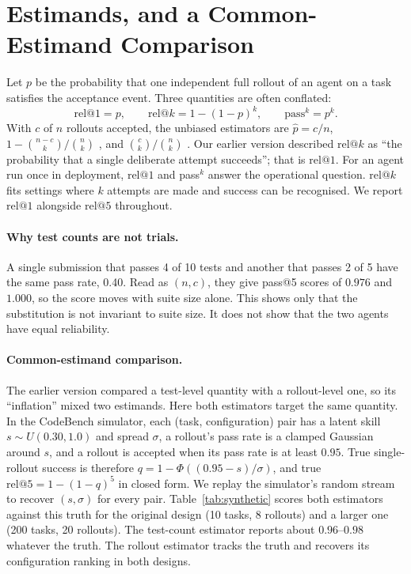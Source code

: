 \documentclass[11pt,a4paper]{article}
\makeatletter
\newcommand{\relk}[1]{\mathrm{rel}@#1}
\makeatother
\begin{document}
\section{Estimands, and a Common-Estimand Comparison}
\label{sec:estimand}

Let $p$ be the probability that one independent full rollout of an agent on a task satisfies the acceptance event. Three quantities are often conflated:
\begin{equation}
  \relk{1}=p,\qquad
  \relk{k}=1-(1-p)^k,\qquad
  \mathrm{pass}^k=p^k .
  \label{eq:estimands}
\end{equation}
With $c$ of $n$ rollouts accepted, the unbiased estimators are $\hat p=c/n$, $1-\binom{n-c}{k}/\binom{n}{k}$ \citep{chen2021codex}, and $\binom{c}{k}/\binom{n}{k}$ \citep{yao2025taubench}. Our earlier version described $\relk{k}$ as ``the probability that a single deliberate attempt succeeds''; that is $\relk{1}$. For an agent run once in deployment, $\relk{1}$ and pass$^k$ answer the operational question. $\relk{k}$ fits settings where $k$ attempts are made and success can be recognised. We report $\relk{1}$ alongside $\relk{5}$ throughout.

\paragraph{Why test counts are not trials.}
A single submission that passes 4 of 10 tests and another that passes 2 of 5 have the same pass rate, 0.40. Read as $(n,c)$, they give pass@5 scores of $0.976$ and $1.000$, so the score moves with suite size alone. This shows only that the substitution is not invariant to suite size. It does not show that the two agents have equal reliability.

\paragraph{Common-estimand comparison.}
The earlier version compared a test-level quantity with a rollout-level one, so its ``inflation'' mixed two estimands. Here both estimators target the same quantity. In the CodeBench simulator, each (task, configuration) pair has a latent skill $s\sim U(0.30,1.0)$ and spread $\sigma$, a rollout's pass rate is a clamped Gaussian around $s$, and a rollout is accepted when its pass rate is at least $0.95$. True single-rollout success is therefore $q=1-\Phi\!\left((0.95-s)/\sigma\right)$, and true $\relk{5}=1-(1-q)^5$ in closed form. We replay the simulator's random stream to recover $(s,\sigma)$ for every pair. Table~\ref{tab:synthetic} scores both estimators against this truth for the original design (10 tasks, 8 rollouts) and a larger one (200 tasks, 20 rollouts). The test-count estimator reports about $0.96$--$0.98$ whatever the truth. The rollout estimator tracks the truth and recovers its configuration ranking in both designs.
\end{document}
